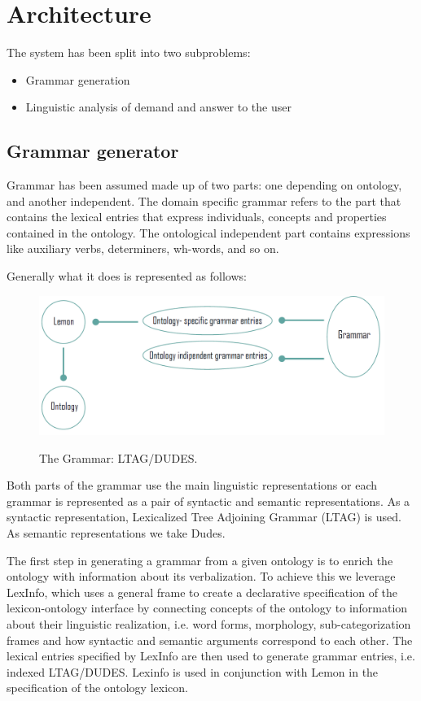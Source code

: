 \section{Architecture}
\label{sec:architecture}
The system has been split into two subproblems:
\begin{itemize}
	\item Grammar generation
	\item Linguistic analysis of demand and answer to the user
\end{itemize}

\subsection{Grammar generator}
Grammar has been assumed made up of two parts: one depending on ontology, and another independent. The domain specific grammar refers to the part that contains the lexical entries that express individuals, concepts and properties contained in the ontology. The ontological independent part contains expressions like auxiliary verbs, determiners, wh-words, and so on.

Generally what it does is represented as follows:

\begin{figure}[H]
   \centering
    \includegraphics[scale=0.5]{./fig/grammar}
    \label{fig:grammar}
    \caption{The Grammar: LTAG/DUDES.}
\end{figure}

Both parts of the grammar use the main linguistic representations or each grammar is represented as a pair of syntactic and semantic representations. As a syntactic representation, Lexicalized Tree Adjoining Grammar (LTAG) is used. As semantic representations we take Dudes.

The first step in generating a grammar from a given ontology is to enrich the ontology with information about its verbalization. To achieve this we leverage LexInfo, which uses a general frame to create a declarative specification of the lexicon-ontology interface by connecting concepts of the ontology to information about their linguistic realization, i.e. word forms, morphology, sub-categorization frames and how syntactic and semantic arguments correspond to each other. The lexical entries specified by LexInfo are then used to generate grammar entries, i.e. indexed LTAG/DUDES.
Lexinfo is used in conjunction with Lemon in the specification of the ontology lexicon. 

